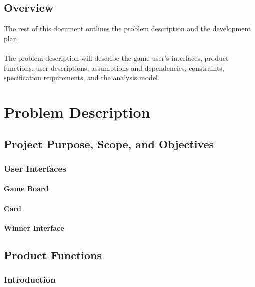 \documentclass[12pt, a4paper]{article}
\begin{document}
	\subsection{Overview}
	
	The rest of this document outlines the problem description and the development plan. \\ 
	\\  
	The problem description will describe the game user's interfaces, product functions, user descriptions, assumptions and dependencies, constraints, specification requirements, and the analysis model. \\  
	
	\newpage
	
\section{Problem Description}

	\subsection{Project Purpose, Scope, and Objectives}
	
		\subsubsection{User Interfaces}
	
			\paragraph{Game Board}
			
			\paragraph{Card}
			
			\paragraph{Winner Interface}
			
	\subsection{Product Functions}
	
		\subsubsection{Introduction}
		
\end{document}
